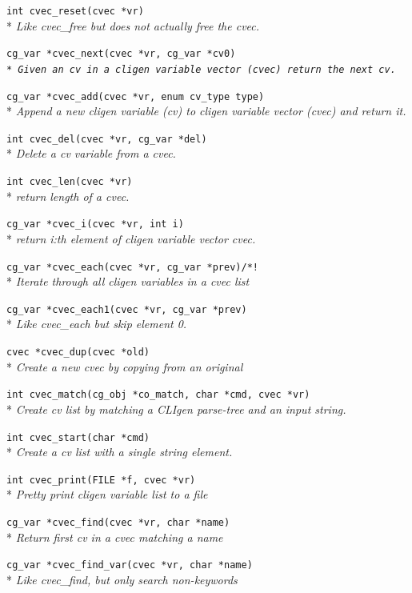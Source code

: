 \documentclass[a4paper, 10pt] {article}
\begin{document}
{\tt int cvec\_reset(cvec *vr)}\\*
\emph{ Like cvec\_free but does not actually free the cvec.}

{\tt cg\_var *cvec\_next(cvec *vr, cg\_var *cv0)\\*
\emph{  Given an cv in a cligen variable vector (cvec) return the next cv.}

{\tt cg\_var *cvec\_add(cvec *vr, enum cv\_type type)}\\*
\emph{  Append a new cligen variable (cv) to cligen variable vector (cvec) and return it.}

{\tt int cvec\_del(cvec *vr, cg\_var *del)}\\*
\emph{  Delete a cv variable from a cvec.}

{\tt int cvec\_len(cvec *vr)}\\*
\emph{ return length of a cvec.}

{\tt cg\_var *cvec\_i(cvec *vr, int i)}\\*
\emph{ return i:th element of cligen variable vector cvec.}

{\tt cg\_var *cvec\_each(cvec *vr, cg\_var *prev)/*! }\\*
\emph{ Iterate through all cligen variables in a cvec list}

{\tt cg\_var *cvec\_each1(cvec *vr, cg\_var *prev)}\\*
\emph{ Like cvec\_each but skip element 0. }

{\tt cvec *cvec\_dup(cvec *old)}\\*
\emph{  Create a new cvec by copying from an original}

{\tt int cvec\_match(cg\_obj *co\_match, char   *cmd, cvec   *vr)}\\*
\emph{ Create cv list by matching a CLIgen parse-tree and an input string. }

{\tt int cvec\_start(char   *cmd)}\\*
\emph{ Create a cv list with a single string element. }

{\tt int cvec\_print(FILE *f, cvec *vr)}\\*
\emph{ Pretty print cligen variable list to a file}

{\tt cg\_var *cvec\_find(cvec *vr, char *name)}\\*
\emph{ Return first cv in a cvec matching a name}

{\tt cg\_var *cvec\_find\_var(cvec *vr, char *name)}\\*
\emph{  Like cvec\_find, but only search non-keywords}

}
\end{document}
